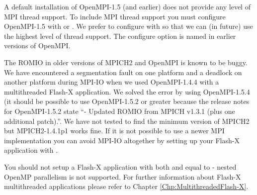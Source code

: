 \begin{flashtip}
A default installation of OpenMPI-1.5 (and earlier) does not provide
any level of MPI thread support.  To include MPI thread support you
must configure OpenMPI-1.5 with  or
.  We prefer to configure with
 so that we can (in future) use the
highest level of thread support.  The configure option is named
 in earlier versions of OpenMPI.
\end{flashtip}

\begin{flashtip}
The ROMIO in older versions of MPICH2 and OpenMPI is known to be
buggy.  We have encountered a segmentation fault on one platform and a
deadlock on another platform during MPI-IO when we used OpenMPI-1.4.4
with a multithreaded Flash-X application.  We solved the error by using
OpenMPI-1.5.4 (it should be possible to use OpenMPI-1.5.2 or greater
because the release notes for OpenMPI-1.5.2 state ``- Updated ROMIO
from MPICH v1.3.1 (plus one additional patch).''.  We have not tested
to find the minimum version of MPICH2 but MPICH2-1.4.1p1 works fine.
If it is not possible to use a newer MPI implementation you can avoid
MPI-IO altogether by setting up your Flash-X application with
.
\end{flashtip}

You should not setup a Flash-X application with both
 and  equal to
 - nested OpenMP parallelism is not supported.  For further
information about Flash-X multithreaded applications please refer to
Chapter \ref{Chp:MultithreadedFlash-X}.


